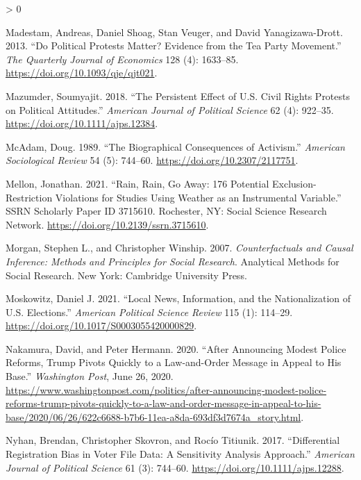 \documentclass[
  12pt,
]{article}
\newlength{\cslhangindent}
\newenvironment{CSLReferences}[2] %
 {%
  \setlength{\parindent}{0pt}
  \ifodd #1 \everypar{\setlength{\hangindent}{\cslhangindent}}\ignorespaces\fi
  \ifnum #2 > 0
  \setlength{\parskip}{#2\baselineskip}
  \fi
 }%
 {}
\begin{document}
\begin{CSLReferences}{1}{0}
\leavevmode\hypertarget{ref-Madestam2013}{}%
Madestam, Andreas, Daniel Shoag, Stan Veuger, and David Yanagizawa-Drott. 2013. {``Do {Political Protests Matter}? {Evidence} from the {Tea Party Movement}.''} \emph{The Quarterly Journal of Economics} 128 (4): 1633--85. \url{https://doi.org/10.1093/qje/qjt021}.

\leavevmode\hypertarget{ref-Mazumder2018}{}%
Mazumder, Soumyajit. 2018. {``The {Persistent Effect} of {U}.{S}. {Civil Rights Protests} on {Political Attitudes}.''} \emph{American Journal of Political Science} 62 (4): 922--35. \url{https://doi.org/10.1111/ajps.12384}.

\leavevmode\hypertarget{ref-McAdam1989}{}%
McAdam, Doug. 1989. {``The {Biographical Consequences} of {Activism}.''} \emph{American Sociological Review} 54 (5): 744--60. \url{https://doi.org/10.2307/2117751}.

\leavevmode\hypertarget{ref-Mellon2021}{}%
Mellon, Jonathan. 2021. {``Rain, {Rain}, {Go Away}: 176 {Potential Exclusion}-{Restriction Violations} for {Studies Using Weather} as an {Instrumental Variable}.''} SSRN Scholarly Paper ID 3715610. {Rochester, NY}: {Social Science Research Network}. \url{https://doi.org/10.2139/ssrn.3715610}.

\leavevmode\hypertarget{ref-Morgan2007}{}%
Morgan, Stephen L., and Christopher Winship. 2007. \emph{Counterfactuals and Causal Inference: Methods and Principles for Social Research}. Analytical Methods for Social Research. {New York}: {Cambridge University Press}.

\leavevmode\hypertarget{ref-Moskowitz2021}{}%
Moskowitz, Daniel J. 2021. {``Local {News}, {Information}, and the {Nationalization} of {U}.{S}. {Elections}.''} \emph{American Political Science Review} 115 (1): 114--29. \url{https://doi.org/10.1017/S0003055420000829}.

\leavevmode\hypertarget{ref-Nakamura2020}{}%
Nakamura, David, and Peter Hermann. 2020. {``After Announcing Modest Police Reforms, {Trump} Pivots Quickly to a Law-and-Order Message in Appeal to His Base.''} \emph{Washington Post}, June 26, 2020. \url{https://www.washingtonpost.com/politics/after-announcing-modest-police-reforms-trump-pivots-quickly-to-a-law-and-order-message-in-appeal-to-his-base/2020/06/26/622c6688-b7b6-11ea-a8da-693df3d7674a_story.html}.

\leavevmode\hypertarget{ref-Nyhan2017}{}%
Nyhan, Brendan, Christopher Skovron, and Rocío Titiunik. 2017. {``Differential {Registration Bias} in {Voter File Data}: {A Sensitivity Analysis Approach}.''} \emph{American Journal of Political Science} 61 (3): 744--60. \url{https://doi.org/10.1111/ajps.12288}.


\end{CSLReferences}
\end{document}
